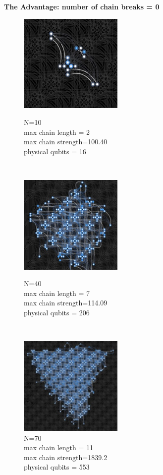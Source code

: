 \documentclass[oneside,a4paper]{article}
\begin{document}
\newpage
\textbf{The Advantage: number of chain breaks = 0}
\begin{figure}[htp]
\begin{minipage}[b]{4.5cm}
\includegraphics[width=5cm]{LaTeXTemplate/Images/AdvantageN10.png}
\caption{N=10\\max chain length = 2\\max chain strength=100.40\\physical qubits = 16}
\end{minipage}
\ \hspace{2mm} \hspace{2mm} \
\begin{minipage}[b]{4.5cm}
\includegraphics[width=5cm]{LaTeXTemplate/Images/AdvantageN40.png}
\caption{N=40\\max chain length = 7\\max chain strength=114.09\\physical qubits = 206}
\end{minipage}
\ \hspace{2mm} \hspace{2mm} \
\begin{minipage}[b]{4.5cm}
\centering
\includegraphics[width=5cm]{LaTeXTemplate/Images/AdvantageN70.png}
\caption{N=70\\max chain length = 11\\max chain strength=1839.2\\physical qubits = 553}
\end{minipage}
\end{figure}
\end{document}
